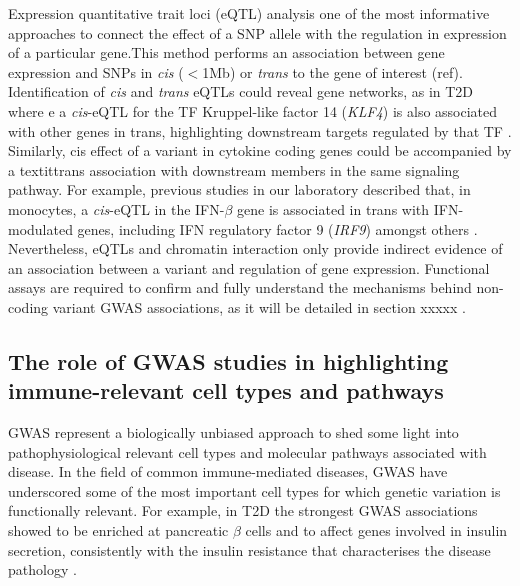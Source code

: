 Expression quantitative trait loci (eQTL) analysis one of the most informative approaches to connect the effect of a SNP allele with the regulation in expression of a particular gene.This method performs an association between gene expression and SNPs in \textit{cis} ($<$1Mb) or \textit{trans} to the gene of interest (ref). Identification of \textit{cis} and \textit{trans} eQTLs could reveal gene networks, as in T2D where e a \textit{cis}-eQTL for the TF Kruppel-like factor 14 (\textit{KLF4}) is also associated with other genes in trans, highlighting downstream targets regulated by that TF \parencite{Small2011}. Similarly, cis effect of a variant in cytokine coding genes could be accompanied by a textit{trans} association with downstream members in the same signaling pathway. For example, previous studies in our laboratory described that, in monocytes, a \textit{cis}-eQTL in the IFN-$\beta$ gene is associated in trans with IFN-modulated genes, including IFN regulatory factor 9 (\textit{IRF9}) amongst others \parencite{Fairfax2014 }. Nevertheless, eQTLs and chromatin interaction only provide indirect evidence of an association between a variant and regulation of gene expression.  Functional assays are required to confirm and fully understand the mechanisms behind non-coding variant GWAS associations, as it will be detailed in section xxxxx \parencite{Edwards2013}.   




\subsection{The role of GWAS studies in highlighting immune-relevant cell types and pathways}

GWAS represent a biologically unbiased approach to shed some light into pathophysiological relevant cell types and molecular pathways associated with disease. In the field of common immune-mediated diseases, GWAS have underscored some of the most important cell types for which genetic variation is functionally relevant. For example, in T2D the strongest GWAS associations showed to be enriched at pancreatic $\beta$ cells and to affect genes involved in insulin secretion, consistently with the insulin resistance that characterises the disease pathology \parencite{Visscher2017}.


